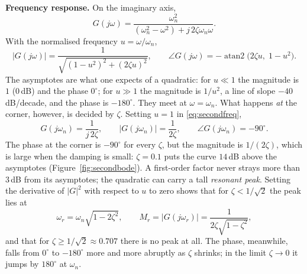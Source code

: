 \documentclass[11pt]{article}
\begin{document}
\smallskip\noindent\textbf{Frequency response.} On the imaginary axis,
\begin{equation}\label{eq:secondfreq}
   G(j\omega) = \frac{\omega_n^{2}}{(\omega_n^{2}-\omega^{2})+j\,2\zeta\omega_n\omega} .
\end{equation}
With the normalised frequency $u=\omega/\omega_n$,
\[
   |G(j\omega)| = \frac{1}{\sqrt{(1-u^{2})^{2}+(2\zeta u)^{2}}},
   \qquad
   \angle G(j\omega) = -\operatorname{atan2}\bigl(2\zeta u,\;1-u^{2}\bigr).
\]
The asymptotes are what one expects of a quadratic: for $u\ll1$ the magnitude is
$1$ (0\,dB) and the phase $0^\circ$; for $u\gg1$ the magnitude is $1/u^{2}$, a line
of slope $-40$\,dB/decade, and the phase is $-180^\circ$. They meet at
$\omega=\omega_n$. What happens \emph{at} the corner, however, is decided by
$\zeta$. Setting $u=1$ in \eqref{eq:secondfreq},
\[
   G(j\omega_n) = \frac{1}{j\,2\zeta},
   \qquad
   |G(j\omega_n)| = \frac{1}{2\zeta},
   \qquad
   \angle G(j\omega_n) = -90^\circ .
\]
The phase at the corner is $-90^\circ$ for every $\zeta$, but the magnitude is
$1/(2\zeta)$, which is large when the damping is small: $\zeta=0.1$ puts the curve
$14$\,dB above the asymptotes (Figure~\ref{fig:secondbode}). A first-order factor
never strays more than $3$\,dB from its asymptotes; the quadratic can carry a tall
\emph{resonant peak}. Setting the derivative of $|G|^{2}$ with respect to $u$ to
zero shows that for $\zeta<1/\sqrt2$ the peak lies at
\begin{equation}\label{eq:resonance}
   \omega_r = \omega_n\sqrt{1-2\zeta^{2}},
   \qquad
   M_r = |G(j\omega_r)| = \frac{1}{2\zeta\sqrt{1-\zeta^{2}}},
\end{equation}
and that for $\zeta\ge1/\sqrt2\approx0.707$ there is no peak at all. The phase,
meanwhile, falls from $0^\circ$ to $-180^\circ$ more and more abruptly as $\zeta$
shrinks; in the limit $\zeta\to0$ it jumps by $180^\circ$ at $\omega_n$.
\end{document}
